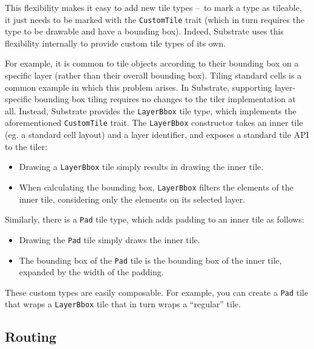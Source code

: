 This flexibility makes it easy to add new tile types – to mark a type as tileable,
it just needs to be marked with the \verb|CustomTile| trait (which in turn requires
the type to be drawable and have a bounding box). Indeed, Substrate uses
this flexibility internally to provide custom tile types of its own.

For example, it is common to tile objects according to their bounding box
on a specific layer (rather than their overall bounding box).
Tiling standard cells is a common example in which this problem arises.
In Substrate, supporting layer-specific bounding box tiling requires no changes
to the tiler implementation at all.
Instead, Substrate provides the \verb|LayerBbox| tile type, which implements the
aforementioned \verb|CustomTile| trait. The \verb|LayerBbox| constructor takes an inner tile
(eg. a standard cell layout) and a layer identifier, and exposes a standard tile API to the tiler:
\begin{itemize}
\item Drawing a \verb|LayerBbox| tile simply results in drawing the inner tile.
\item When calculating the bounding box, \verb|LayerBbox| filters the elements of the inner tile, considering
  only the elements on its selected layer.
\end{itemize}

Similarly, there is a \verb|Pad| tile type, which adds padding to an inner tile as follows:
\begin{itemize}
\item Drawing the \verb|Pad| tile simply draws the inner tile.
\item The bounding box of the \verb|Pad| tile is the bounding box of the inner tile, expanded by the width of the padding.
\end{itemize}

These custom types are easily composable. For example, you can create a \verb|Pad| tile that wraps a \verb|LayerBbox| tile
that in turn wraps a ``regular'' tile.


\subsection{Routing} \label{sec:routing}

